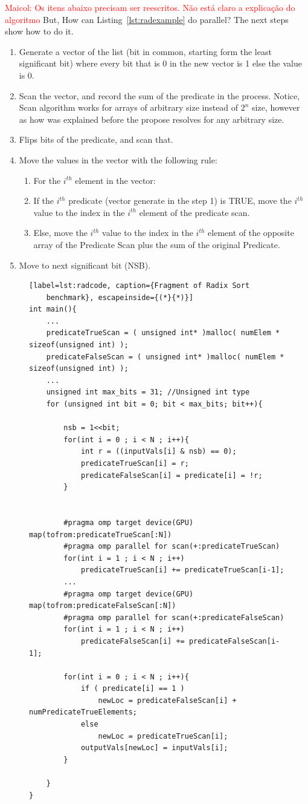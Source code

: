 \documentclass[Ingles]{ic-tese-v1}
\newcommand{\marcio}[1]{\textcolor{red}{ {#1}}}
\newcommand{\marcio}[1]{}
\newcommand{\rlst}[1]{Listing~\ref{lst:#1}}
\begin{document}
\marcio{Maicol: Os itens abaixo precisam ser reescritos. Não está claro a explicação do algoritmo}
But, How can \rlst{radexample} do parallel?
The next steps show how to do it.
\begin{enumerate}
\item Generate a vector of the list (bit in common, starting form the least significant bit)
where every bit that is 0 in the new vector is 1 else the value is 0.
\item Scan the vector, and record the sum of the predicate in the process. Notice, Scan
algorithm works for arrays of arbitrary size instead of $2^{n}$ size, however as how was
explained before the propose resolves for any arbitrary size.
\item Flips bits of the predicate, and scan that.
\item Move the values in the vector with the following rule:
\begin{enumerate}
\item For the $i^{th}$ element in the vector:
\item If the $i^{th}$ predicate (vector generate in the step 1) is TRUE, move the $i^{th}$
value to the index in the $i^{th}$ element of the predicate scan.
\item Else, move the $i^{th}$ value to the index in the $i^{th}$ element of the opposite array
of the Predicate Scan plus the sum of the original Predicate.
\end{enumerate}
\item Move to next significant bit (NSB).
\end{enumerate}


\begin{figure}[t]
	\lstset{basicstyle=\scriptsize}
	\begin{lstlisting}[label=lst:radcode, caption={Fragment of Radix Sort
	benchmark}, escapeinside={(*}{*)}]
int main(){
	...
	predicateTrueScan = ( unsigned int* )malloc( numElem * sizeof(unsigned int) );
	predicateFalseScan = ( unsigned int* )malloc( numElem * sizeof(unsigned int) );
	...
	unsigned int max_bits = 31; //Unsigned int type
	for (unsigned int bit = 0; bit < max_bits; bit++){

		nsb = 1<<bit;
		for(int i = 0 ; i < N ; i++){
			int r = ((inputVals[i] & nsb) == 0);
			predicateTrueScan[i] = r;
			predicateFalseScan[i] = predicate[i] = !r;
		}


		#pragma omp target device(GPU) map(tofrom:predicateTrueScan[:N])
		#pragma omp parallel for scan(+:predicateTrueScan)
		for(int i = 1 ; i < N ; i++)
			predicateTrueScan[i] += predicateTrueScan[i-1];
		...
		#pragma omp target device(GPU) map(tofrom:predicateFalseScan[:N])
		#pragma omp parallel for scan(+:predicateFalseScan)
		for(int i = 1 ; i < N ; i++)
			predicateFalseScan[i] += predicateFalseScan[i-1];

		for(int i = 0 ; i < N ; i++){
			if ( predicate[i] == 1 )
				newLoc = predicateFalseScan[i] + numPredicateTrueElements;
			else
				newLoc = predicateTrueScan[i];
			outputVals[newLoc] = inputVals[i];
		}

	}
}
	\end{lstlisting}
\end{figure}
\end{document}
